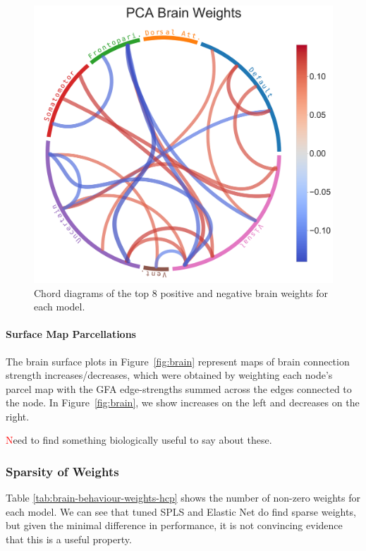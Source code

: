 \begin{figure}
\includegraphics[width=0.49\linewidth]{figures/hcp/PCA brain weights}
\caption{Chord diagrams of the top 8 positive and negative brain weights for each model.}\label{fig:chord_weights}
\end{figure}

\paragraph{Surface Map Parcellations}
The brain surface plots in Figure~\ref{fig:brain} represent maps of brain connection strength increases/decreases, which
were obtained by weighting each node’s parcel map with the GFA edge-strengths summed across the edges
connected to the node.
In Figure~\ref{fig:brain}, we show increases on the left and decreases on the right.

\textcolor{red} Need to find something biologically useful to say about these.
%

\subsubsection{Sparsity of Weights}

Table \ref{tab:brain-behaviour-weights-hcp} shows the number of non-zero weights for each model.
We can see that tuned SPLS and Elastic Net do find sparse weights, but given the minimal difference in performance, it is not convincing evidence that this is a useful property.


